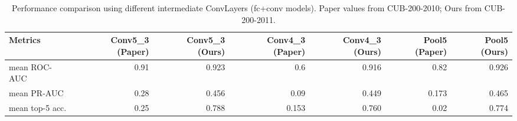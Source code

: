 
\begin{table}[t]
\centering
\scriptsize
\caption{Performance comparison using different intermediate ConvLayers (fc+conv models). Paper values from CUB-200-2010; Ours from CUB-200-2011.}
\label{tab:table3}
\begin{tabular}{lrrrrrr}
\toprule
Metrics & Conv5\_3 (Paper) & Conv5\_3 (Ours) & Conv4\_3 (Paper) & Conv4\_3 (Ours) & Pool5 (Paper) & Pool5 (Ours) \\ \midrule
mean ROC-AUC & 0.91 & 0.923 & 0.6 & 0.916 & 0.82 & 0.926 \\
mean PR-AUC & 0.28 & 0.456 & 0.09 & 0.449 & 0.173 & 0.465 \\
mean top-5 acc. & 0.25 & 0.788 & 0.153 & 0.760 & 0.02 & 0.774 \\
 \bottomrule
\end{tabular}
\end{table}

